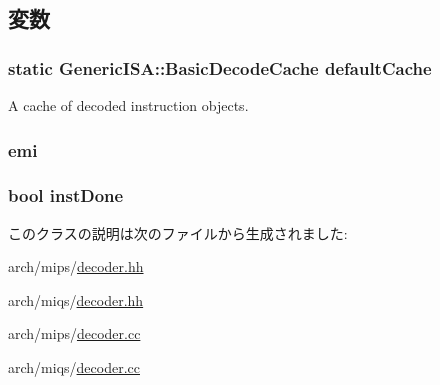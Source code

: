 \subsection{変数}
\hypertarget{classMipsISA_1_1Decoder_abbd53aa079e76dea4263764f171d9cc0}{
\subsubsection[{defaultCache}]{\setlength{\rightskip}{0pt plus 5cm}static {\bf GenericISA::BasicDecodeCache} {\bf defaultCache}}}
\label{classMipsISA_1_1Decoder_abbd53aa079e76dea4263764f171d9cc0}


A cache of decoded instruction objects. \hypertarget{classMipsISA_1_1Decoder_abf211faf305b89c9093b00b6b82b0bd1}{
\subsubsection[{emi}]{ {\bf emi}}}
\label{classMipsISA_1_1Decoder_abf211faf305b89c9093b00b6b82b0bd1}
\hypertarget{classMipsISA_1_1Decoder_a37c5d55785204b8fd00a8ebf62e1fc33}{
\subsubsection[{instDone}]{\setlength{\rightskip}{0pt plus 5cm}bool {\bf instDone}}}
\label{classMipsISA_1_1Decoder_a37c5d55785204b8fd00a8ebf62e1fc33}


このクラスの説明は次のファイルから生成されました:\begin{DoxyCompactItemize}
\item 
arch/mips/\hyperlink{mips_2decoder_8hh}{decoder.hh}\item 
arch/miqs/\hyperlink{miqs_2decoder_8hh}{decoder.hh}\item 
arch/mips/\hyperlink{mips_2decoder_8cc}{decoder.cc}\item 
arch/miqs/\hyperlink{miqs_2decoder_8cc}{decoder.cc}\end{DoxyCompactItemize}
